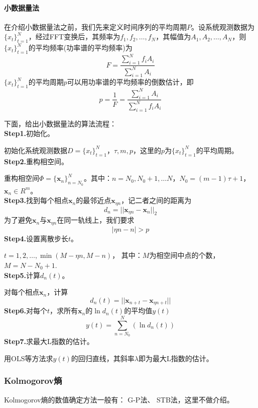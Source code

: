             \paragraph{小数据量法}
            在介绍小数据量法之前，我们先来定义时间序列的平均周期$P$。设系统观测数据为$\{x_t\}_{t=1}^N$，经过FFT变换后，其频率为$f_1,f_2,\dots, f_N$，其幅值为$A_1,A_2,\dots,A_N$，则$\{x_t\}_{t=1}^N$的平均频率(功率谱的平均频率)为
            \[
                F = \frac{\sum_{i = 1}^N f_i A_i}{\sum_{i = 1}^N A_i}
            \]
            $\{x_t\}_{t=1}^N$的平均周期$p$可以用功率谱的平均频率的倒数估计，即
            \[
                p = \frac{1}{F} = \frac{\sum_{i = 1}^N A_i}{\sum_{i = 1}^N f_i A_i}
            \]

            下面，给出小数据量法的算法流程：\\
            \textbf{Step1.}初始化。\par
            初始化系统观测数据$D=\{x_t\}_{t=1}^N$，$\tau ,m, p$，这里的$p$为$\{x_t\}_{t=1}^N$的平均周期。\\
            \textbf{Step2.}重构相空间。\par
            重构相空间$\Phi = \{\mathbf{x}_n\}_{n=N_0}^N$。其中：$n = N_0,N_0+1,\dots N$，$N_0 = (m-1) \tau + 1$，$\mathbf{x}_n \in R^m$。\\
            \textbf{Step3.}找到每个相点$\mathbf{x}_n$的最邻近点$\mathbf{x}_{\eta n}$，记二者之间的距离为
            \[
                d_n = ||\mathbf{x}_{\eta n} - \mathbf{x}_n||_2
            \]
            为了避免$\mathbf{x}_n$与$\mathbf{x}_{\eta n}$在同一轨线上，我们要求
            \[
                |\eta n - n| > p
            \]
            \textbf{Step4.}设置离散步长$t$。\par
            $t = 1,2,\dots ,\min (M-\eta n, M-n)$，
            其中：$M$为相空间中点的个数，$M = N- N_0+1$.\\
            \textbf{Step5.}计算$d_n(t)$。\par
            对每个相点$\mathbf{x}_n$，计算
            \[
                d_n(t) = ||\mathbf{x}_{n+t} - \mathbf{x}_{\eta n+t}||
            \]
            \textbf{Step6.}对每个$t$，求所有$\mathbf{x}_n$的$\ln d_n(t)$的平均值$y(t)$
            \[
                y(t) = \sum_{n = N_0}^N(\ln d_n(t))
            \]
            \textbf{Step7.}求最大L指数的估计。\par
            用OLS等方法求$y(t)$的回归直线，其斜率$\lambda$即为最大L指数的估计。

        \subsubsection{Kolmogorov熵}
            \par
            Kolmogorov熵的数值确定方法一般有： G-P法、 STB法，这里不做介绍。

